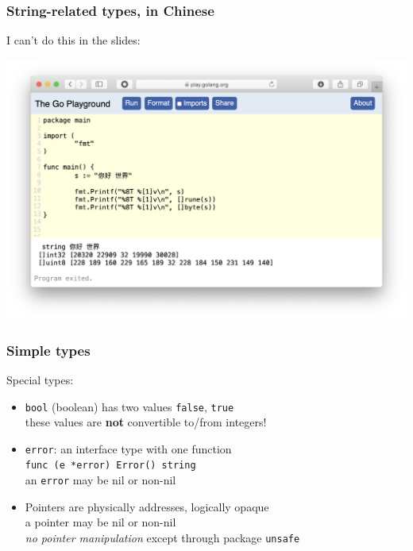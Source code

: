\documentclass[handout,compress,t,11pt]{beamer}
\begin{document}
\begin{frame}[fragile]
\frametitle{String-related types, in Chinese}
I can't do this in the slides:
    \vspace{-0.4\baselineskip}
\begin{center}
\includegraphics[height=0.9\textheight]{go-playground-chinese.png}
\end{center}
\end{frame}

\begin{frame}[fragile]
    \frametitle{Simple types}
    Special types:
    \begin{itemize}
        \item \verb|bool| (boolean) has two values \verb|false|, \verb|true| \\
        \vspace{0.5\baselineskip}
        these values are {\bf not} convertible to/from integers!
        \vspace{\baselineskip}
        \item \verb|error|: an interface type with one function \\
        \vspace{0.5\baselineskip}
        \verb|func (e *error) Error() string| \\
        \vspace{0.5\baselineskip}
        an \verb|error| may be nil or non-nil
        \vspace{\baselineskip}
        \item Pointers are physically addresses, logically opaque \\
        \vspace{0.5\baselineskip}
        a pointer may be nil or non-nil \\
        {\em no pointer manipulation} except through package \verb|unsafe|
    \end{itemize}
\end{frame}
\end{document}
